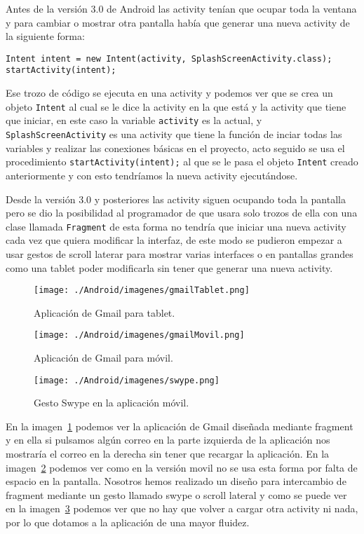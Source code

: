 Antes de la versión 3.0 de Android las activity tenían que ocupar toda la ventana y para cambiar o mostrar otra pantalla había que generar una nueva activity de la siguiente forma:

\begin{lstlisting}[style=Java]
Intent intent = new Intent(activity, SplashScreenActivity.class);
startActivity(intent);
\end{lstlisting}

Ese trozo de código se ejecuta en una activity y podemos ver que se crea un objeto \lstinline{Intent} al cual se le dice la activity en la que está y la activity que tiene que iniciar, en este caso la variable \lstinline{activity} es la actual, y \lstinline{SplashScreenActivity} es una activity que tiene la función de inciar todas las variables y realizar las conexiones básicas en el proyecto, acto seguido se usa el procedimiento \lstinline{startActivity(intent);} al que se le pasa el objeto \lstinline{Intent} creado anteriormente y con esto tendríamos la nueva activity ejecutándose.

Desde la versión 3.0 y posteriores las activity siguen ocupando toda la pantalla pero se dio la posibilidad al programador de que usara solo trozos de ella con una clase llamada \lstinline{Fragment} de esta forma no tendría que iniciar una nueva activity cada vez que quiera modificar la interfaz, de este modo se pudieron empezar a usar gestos de scroll laterar para mostrar varias interfaces o en pantallas grandes como una tablet poder modificarla sin tener que generar una nueva activity. 
\begin{figure}
  \centering
    \texttt{[image: ./Android/imagenes/gmailTablet.png]}
  \caption{Aplicación de Gmail para tablet.}
  \label{fig:gmailTablet}
\end{figure}

\begin{figure}
  \centering
    \texttt{[image: ./Android/imagenes/gmailMovil.png]}
  \caption{Aplicación de Gmail para móvil.}
  \label{fig:gmailMovil}
\end{figure}

\begin{figure}[h]
  \centering
    \texttt{[image: ./Android/imagenes/swype.png]}
  \caption{Gesto Swype en la aplicación móvil.}
  \label{fig:swype}
\end{figure}

En la imagen~\ref{fig:gmailTablet} podemos ver la aplicación de Gmail diseñada mediante fragment y en ella si pulsamos algún correo en la parte izquierda de la aplicación nos mostraría el correo en la derecha sin tener que recargar la aplicación. En la imagen~\ref{fig:gmailMovil} podemos ver como en la versión movil no se usa esta forma por falta de espacio en la pantalla. Nosotros hemos realizado un diseño para intercambio de fragment mediante un gesto llamado swype o scroll lateral y como se puede ver en la imagen~\ref{fig:swype} podemos ver que no hay que volver a cargar otra activity ni nada, por lo que dotamos a la aplicación de una mayor fluidez.

